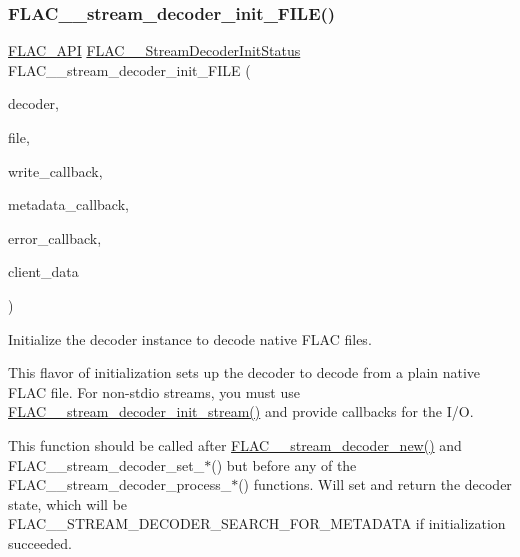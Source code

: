 \subsubsection{\texorpdfstring{F\+L\+A\+C\+\_\+\+\_\+stream\+\_\+decoder\+\_\+init\+\_\+\+F\+I\+L\+E()}{FLAC\_\_stream\_decoder\_init\_FILE()}}
{\footnotesize\ttfamily \hyperlink{group__flac__export_ga56ca07df8a23310707732b1c0007d6f5}{F\+L\+A\+C\+\_\+\+A\+PI} \hyperlink{group__flac__stream__decoder_gaaed54a24ac6310d29c5cafba79759c44}{F\+L\+A\+C\+\_\+\+\_\+\+Stream\+Decoder\+Init\+Status} F\+L\+A\+C\+\_\+\+\_\+stream\+\_\+decoder\+\_\+init\+\_\+\+F\+I\+LE (\begin{DoxyParamCaption}\item[{\hyperlink{struct_f_l_a_c_____stream_decoder}{F\+L\+A\+C\+\_\+\+\_\+\+Stream\+Decoder} $\ast$}]{decoder,  }\item[{F\+I\+LE $\ast$}]{file,  }\item[{\hyperlink{group__flac__stream__decoder_ga61e48dc2c0d2f6c5519290ff046874a4}{F\+L\+A\+C\+\_\+\+\_\+\+Stream\+Decoder\+Write\+Callback}}]{write\+\_\+callback,  }\item[{\hyperlink{group__flac__stream__decoder_ga6aa87c01744c1c601b7f371f627b6e14}{F\+L\+A\+C\+\_\+\+\_\+\+Stream\+Decoder\+Metadata\+Callback}}]{metadata\+\_\+callback,  }\item[{\hyperlink{group__flac__stream__decoder_gac896ee6a12668e9015fab4fbc6aae996}{F\+L\+A\+C\+\_\+\+\_\+\+Stream\+Decoder\+Error\+Callback}}]{error\+\_\+callback,  }\item[{\hyperlink{png_8h_ac9c84fa68bbad002983e35ce3663c686}{void} $\ast$}]{client\+\_\+data }\end{DoxyParamCaption})}

Initialize the decoder instance to decode native F\+L\+AC files.

This flavor of initialization sets up the decoder to decode from a plain native F\+L\+AC file. For non-\/stdio streams, you must use \hyperlink{group__flac__stream__decoder_ga32c28a56a2bdfa2333edbd3d991894d7}{F\+L\+A\+C\+\_\+\+\_\+stream\+\_\+decoder\+\_\+init\+\_\+stream()} and provide callbacks for the I/O.

This function should be called after \hyperlink{group__flac__stream__decoder_ga7159eefc074dfbab4a37462f69326091}{F\+L\+A\+C\+\_\+\+\_\+stream\+\_\+decoder\+\_\+new()} and F\+L\+A\+C\+\_\+\+\_\+stream\+\_\+decoder\+\_\+set\+\_\+$\ast$() but before any of the F\+L\+A\+C\+\_\+\+\_\+stream\+\_\+decoder\+\_\+process\+\_\+$\ast$() functions. Will set and return the decoder state, which will be F\+L\+A\+C\+\_\+\+\_\+\+S\+T\+R\+E\+A\+M\+\_\+\+D\+E\+C\+O\+D\+E\+R\+\_\+\+S\+E\+A\+R\+C\+H\+\_\+\+F\+O\+R\+\_\+\+M\+E\+T\+A\+D\+A\+TA if initialization succeeded.


